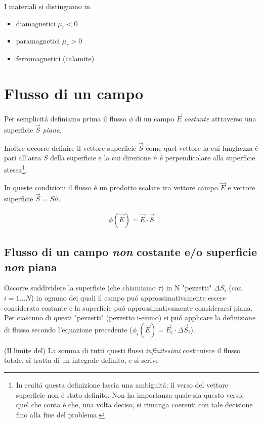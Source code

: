 \documentclass[17pt]{article}
\begin{document}
I materiali si distinguono in
\begin{itemize}
	\item diamagnetici $\mu_r < 0$
	\item paramagnetici $\mu_r > 0$
	\item ferromagnetici (calamite) 
\end{itemize}






\section{Flusso di un campo}\label{sec:flusso}
Per semplicit\'a definiamo prima il flusso $\phi$ di un campo $\vec{E}$ \emph{costante} attraverso una superficie $\vec{S}$ \emph{piana}. 

Inoltre occorre definire il vettore superficie $\vec{S}$ come quel vettore la cui lunghezza \'e pari all'area $S$ della superficie e la cui direzione $\hat{n}$ \'e perpendicolare alla superficie stessa\footnote{In realt\'a questa definizione lascia una ambiguit\'a: il verso del vettore superficie non \'e stato definito. Non ha importanza quale sia questo verso, quel che conta \'e che, una volta deciso, si rimanga coerenti con tale decisione fino alla fine del problema.}. 

In queste condizioni il flusso \'e un prodotto scalare tra vettore campo $\vec{E}$ e vettore superficie $\vec{S}=S\hat{n}$. 

\begin{eqnarray}\label{eq:flusso}
	\phi(\vec{E}) = \vec{E}\cdot\vec{S}
\end{eqnarray}
	

\subsection{Flusso di un campo \emph{non} costante e/o superficie \emph{non} piana}

Occorre suddividere la superficie (che chiamiamo $\tau$) in N "pezzetti" $\Delta S_i$ (con $i = 1\dots N$) in ognuno dei quali il campo pu\'o approssimativamente essere considerato costante e la superficie pu\'o approssimativamente considerarsi piana. Per ciascuno di questi "pezzetti" (pezzetto i-esimo) si pu\'o applicare la definizione di flusso secondo l'equazione precedente ($\phi_i(\vec{E}) = \vec{E}_i\cdot\Delta\vec{S}_i$).

(Il limite del) La somma di tutti questi flussi \emph{infinitesimi} costituisce il flusso totale, si tratta di un integrale definito, e si scrive
\end{document}

